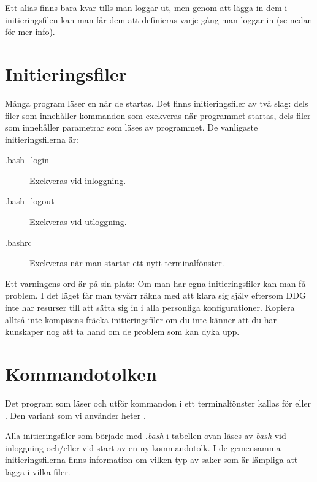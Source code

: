\documentclass[a4paper,twocolumn]{book}
\begin{document}
Ett alias finns bara kvar tills man loggar ut,
men genom att lägga in dem i initieringsfilen  kan man
får dem att definieras varje gång man loggar in (se nedan för
mer info).

\section{Initieringsfiler}

Många program läser en  när de startas. Det
finns initieringsfiler av två slag: dels filer som innehåller
kommandon som exekveras när programmet startas, dels filer som
innehåller parametrar som läses av programmet. De vanligaste
initieringsfilerna är:
\begin{description}
  \item[.bash\_login] Exekveras vid inloggning.
  \item[.bash\_logout] Exekveras vid utloggning.
  \item[.bashrc] Exekveras när man startar ett nytt
    terminalfönster.
\end{description}

Ett varningens ord är på sin plats: Om man har egna initieringsfiler kan man
få problem. I det läget får man tyvärr räkna med att klara sig själv eftersom
DDG inte har resurser till att sätta sig in i alla personliga konfigurationer.
Kopiera alltså inte kompisens fräcka initieringsfiler om du inte känner att du
har kunskaper nog att ta hand om de problem som kan dyka upp.

\section{Kommandotolken}

Det program som läser och utför kommandon i ett terminalfönster kallas
för  eller . Den variant som vi
använder heter .

Alla initieringsfiler som började med \emph{.bash} i tabellen ovan läses
av \emph{bash} vid inloggning och/eller vid start av en ny
kommandotolk. I de gemensamma initieringsfilerna finns information om
vilken typ av saker som är lämpliga att lägga i vilka filer.
\end{document}

